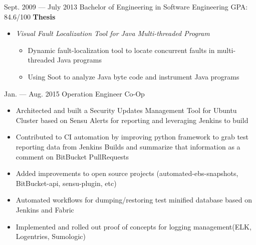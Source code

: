 \documentclass{newresume}
\begin{document}
\begin{body}
	{Sept. 2009 --- July 2013}
	{Bachelor of Engineering in Software Engineering}
	{GPA: 84.6/100}
	\textbf{Thesis}
	\begin{itemize}
	\item \textit{Visual Fault Localization Tool for Java Multi-threaded Program}
	\begin{itemize}
		\item Dynamic fault-localization tool to locate concurrent faults in multi-threaded Java programs
		\item Using Soot to analyze Java byte code and instrument Java programs
	\end{itemize}
	\end{itemize}
\end{body}

\smallskip

\begin{body}
	{Jan. --- Aug. 2015}
	{Operation Engineer Co-Op}
	{}
	\begin{itemize}[noitemsep,topsep=0pt]
		\item Architected and built a Security Updates Management Tool for Ubuntu Cluster based on Sensu Alerts for reporting and leveraging Jenkins to build
		\item Contributed to CI automation by improving python framework to grab test reporting data from Jenkins Builds and summarize that information as a comment on BitBucket PullRequests
		\item Added improvements to open source projects (automated-ebs-snapshots, BitBucket-api, sensu-plugin, etc)
		\item Automated workflows for dumping/restoring test minified database based on Jenkins and Fabric
		\item Implemented and rolled out proof of concepts for logging management(ELK, Logentries, Sumologic)
	\end{itemize}
\end{body}
\end{document}

